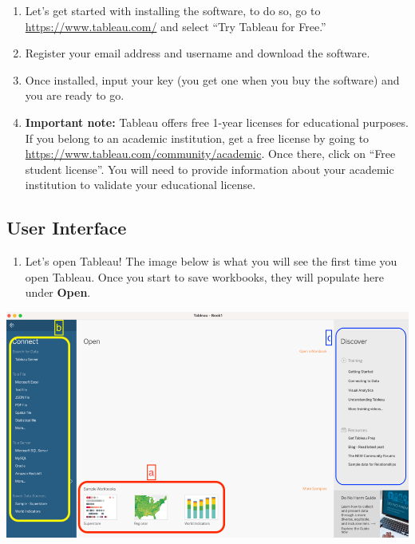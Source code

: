 \documentclass[
]{book}
\providecommand{\tightlist}{%
  \setlength{\itemsep}{0pt}\setlength{\parskip}{0pt}}
\begin{document}
\begin{enumerate}
\def\labelenumi{\arabic{enumi}.}
\item
  Let's get started with installing the software, to do so, go to
  \url{https://www.tableau.com/} and select ``Try Tableau for Free.''
\item
  Register your email address and username and download the software.
\item
  Once installed, input your key (you get one when you buy the software) and you are ready to go.
\item
  \textbf{Important note:} Tableau offers free 1-year licenses for educational purposes. If you belong to an academic institution, get a free license by going to \url{https://www.tableau.com/community/academic}. Once there, click on ``Free student license''. You will need to provide information about your academic institution to validate your educational license.
\end{enumerate}

\hypertarget{user-interface}{%
\subsection{User Interface}\label{user-interface}}

\begin{enumerate}
\def\labelenumi{\arabic{enumi}.}
\tightlist
\item
  Let's open Tableau! The image below is what you will see the first time you open Tableau. Once you start to save workbooks, they will populate here under \textbf{Open}.
\end{enumerate}

\includegraphics{images/M3S1_image0_User_Interface.png}
\end{document}
